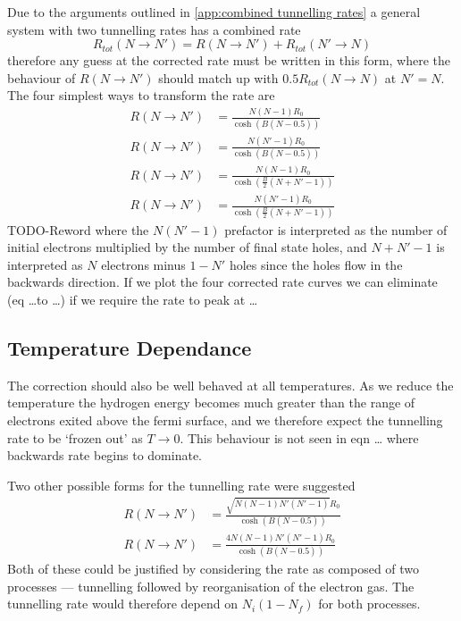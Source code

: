 Due to the arguments outlined in
\cref{app:combined tunnelling rates}
a general system with two tunnelling
rates has a combined rate
\begin{equation}
    R_{tot}(N\rightarrow{}N') = R(N\rightarrow{}N') + R_{tot}(N'\rightarrow{}N)
\end{equation}
therefore any guess at the corrected rate
must be written in this form, where the
behaviour of \(R(N\rightarrow{}N')\)
should match up with \(0.5 R_{tot}(N\rightarrow{}N)\)
at \(N' = N\). The four simplest
ways to transform the rate are
\begin{align}
    R(N\rightarrow{}N') & = \frac{N(N-1) R_0}{\cosh{(B(N - 0.5))}}               \\
    R(N\rightarrow{}N') & = \frac{N(N'-1) R_0}{\cosh{(B(N - 0.5))}}              \\
    R(N\rightarrow{}N') & = \frac{N(N-1) R_0}{\cosh{(\frac{B}{2}(N + N' - 1))}}  \\
    R(N\rightarrow{}N') & = \frac{N(N'-1) R_0}{\cosh{(\frac{B}{2}(N + N' - 1))}}
    \label{eqn:double corrected rate expression}
\end{align}
TODO-Reword
where the \(N(N'-1)\) prefactor is interpreted
as the number of initial electrons multiplied
by the number of final state holes, and
\( N + N' - 1 \) is interpreted as
\(N\) electrons minus \(1 -N' \) holes
since the holes flow in the backwards direction.
If we plot the four corrected rate curves
we can eliminate (eq \ldots to \ldots) if we
require the rate to peak at  \ldots

\subsection{Temperature Dependance}
The correction should also be well behaved
at all temperatures. As we reduce the
temperature the hydrogen
energy becomes much greater than the
range of electrons exited above the fermi
surface, and we therefore expect the tunnelling
rate to be `frozen out' as \(T\rightarrow{}0\).
This behaviour is not seen in eqn \ldots
where backwards rate begins to
dominate.

Two other possible forms for the
tunnelling rate were suggested
\begin{align}
    R(N\rightarrow{}N') & = \frac{\sqrt{N(N-1)N'(N'-1)} R_0}{\cosh{(B(N - 0.5))}}                             \\
    R(N\rightarrow{}N') & = \frac{4N(N-1)N'(N'-1) R_0}{\cosh{(B(N - 0.5))}}\label{eqn:two hop corrected rate}
\end{align}
Both of these could be justified by considering
the rate as composed of two processes ---
tunnelling followed by reorganisation of
the electron gas. The tunnelling rate
would therefore depend on \(N_{i}(1-N_{f})\)
for both processes.


